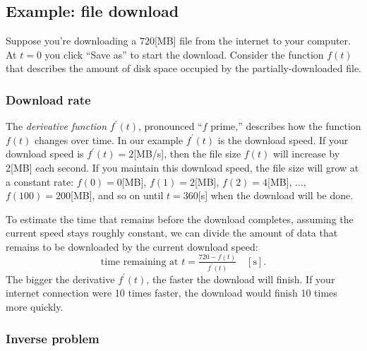 
\subsection{Example: file download}
\label{introduction:download_example}

	Suppose you're downloading a $720$[MB] file from the internet to your computer.
	At $t=0$ you click ``Save as'' to start the download.
	Consider the function $f(t)$
	that describes the amount of disk space occupied by the partially-downloaded file.

	\subsubsection{Download rate}
	\label{introduction:download_rate}

		The \emph{derivative function} $f^{\prime\!}(t)$,
		pronounced ``\:\!\!$f$ prime,''
		describes how the function $f(t)$ changes over time.
		In our example $f^{\prime\!}(t)$ is the download speed.
		If your download speed is $f^{\prime\!}(t)=2$[MB/s],
		then the file size $f(t)$ will increase by 2[MB] each second.
		If you maintain this download speed,
		the file size will grow at a constant rate:
		$f(0)=0$[MB], $f(1)=2$[MB], $f(2)=4$[MB], $\ldots$, $f(100)=200$[MB],
		and so on until $t=360$[s] when the download will be done.

		To estimate the time that remains before the download completes,
		assuming the current speed stays roughly constant,
		we can divide the amount of data that remains to be downloaded
		by the current download speed:
		\[
			\text{time remaining at } t = \tfrac{ 720 - f(t) }{ f^{\prime\!}(t) } \quad [\textrm{s}].
		\]
		The bigger the derivative $f^{\prime\!}(t)$,
		the faster the download will finish.
		If your internet connection were 10 times faster,
		the download would finish 10 times more quickly.


	\subsubsection{Inverse problem}
	\label{introduction:inverse_problem}

